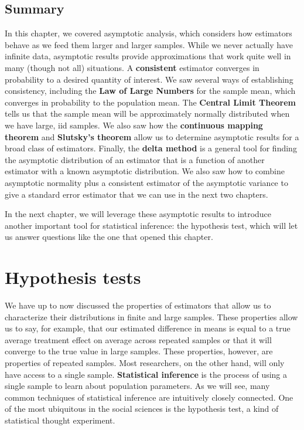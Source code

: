 \documentclass[
  13pt,
  letterpaper,
  DIV=11,
  numbers=noendperiod]{scrreprt}
\theoremstyle{plain}
\theoremstyle{plain}
\theoremstyle{definition}
\theoremstyle{definition}
\theoremstyle{remark}
\begin{document}
\section{Summary}\label{summary-2}

In this chapter, we covered asymptotic analysis, which considers how
estimators behave as we feed them larger and larger samples. While we
never actually have infinite data, asymptotic results provide
approximations that work quite well in many (though not all) situations.
A \textbf{consistent} estimator converges in probability to a desired
quantity of interest. We saw several ways of establishing consistency,
including the \textbf{Law of Large Numbers} for the sample mean, which
converges in probability to the population mean. The \textbf{Central
Limit Theorem} tells us that the sample mean will be approximately
normally distributed when we have large, iid samples. We also saw how
the \textbf{continuous mapping theorem} and \textbf{Slutsky's theorem}
allow us to determine asymptotic results for a broad class of
estimators. Finally, the \textbf{delta method} is a general tool for
finding the asymptotic distribution of an estimator that is a function
of another estimator with a known asymptotic distribution. We also saw
how to combine asymptotic normality plus a consistent estimator of the
asymptotic variance to give a standard error estimator that we can use
in the next two chapters.

In the next chapter, we will leverage these asymptotic results to
introduce another important tool for statistical inference: the
hypothesis test, which will let us answer questions like the one that
opened this chapter.

\chapter{Hypothesis tests}\label{sec-hypothesis-tests}

We have up to now discussed the properties of estimators that allow us
to characterize their distributions in finite and large samples. These
properties allow us to say, for example, that our estimated difference
in means is equal to a true average treatment effect on average across
repeated samples or that it will converge to the true value in large
samples. These properties, however, are properties of repeated samples.
Most researchers, on the other hand, will only have access to a single
sample. \textbf{Statistical inference} is the process of using a single
sample to learn about population parameters. As we will see, many common
techniques of statistical inference are intuitively closely connected.
One of the most ubiquitous in the social sciences is the hypothesis
test, a kind of statistical thought experiment.
\end{document}
